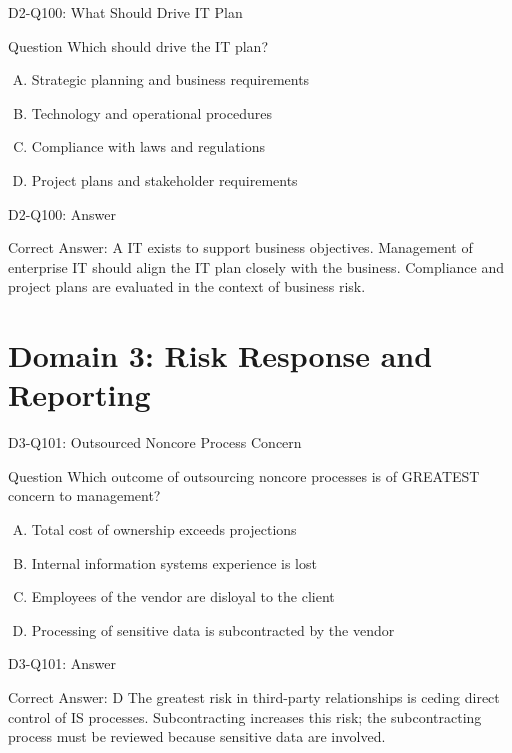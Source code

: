 \documentclass{beamer}
\begin{document}
	\begin{frame}{D2-Q100: What Should Drive IT Plan}
		\begin{block}{Question}
			Which should drive the IT plan?
		\end{block}
		\begin{enumerate}[(A)]
			\item Strategic planning and business requirements
			\item Technology and operational procedures
			\item Compliance with laws and regulations
			\item Project plans and stakeholder requirements
		\end{enumerate}
	\end{frame}
	\begin{frame}{D2-Q100: Answer}
		\begin{block}{Correct Answer: A}
			IT exists to support business objectives. Management of enterprise IT should align the IT plan closely with the business. Compliance and project plans are evaluated in the context of business risk.
		\end{block}
	\end{frame}
	
	\section{Domain 3: Risk Response and Reporting}
	
	\begin{frame}{D3-Q101: Outsourced Noncore Process Concern}
		\begin{block}{Question}
			Which outcome of outsourcing noncore processes is of GREATEST concern to management?
		\end{block}
		\begin{enumerate}[(A)]
			\item Total cost of ownership exceeds projections
			\item Internal information systems experience is lost
			\item Employees of the vendor are disloyal to the client
			\item Processing of sensitive data is subcontracted by the vendor
		\end{enumerate}
	\end{frame}
	\begin{frame}{D3-Q101: Answer}
		\begin{block}{Correct Answer: D}
			The greatest risk in third-party relationships is ceding direct control of IS processes. Subcontracting increases this risk; the subcontracting process must be reviewed because sensitive data are involved.
		\end{block}
	\end{frame}
	
\end{document}
